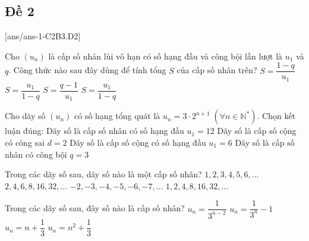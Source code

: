 \subsection{Đề 2}%
[ans/ans-1-C2B3.D2]
\caulc
%
\begin{ex}%
	Cho $(u_n)$ là cấp số nhân lùi vô hạn có số hạng đầu và công bội lần lượt là $u_1$ và $q$. Công thức nào sau đây dùng để tính tổng $S$ của cấp số nhân trên?
	\choice
	{$S=\dfrac{1-q}{u_1}$}
	{$S=\dfrac{u_1}{1-q}$}
	{$S=\dfrac{q-1}{u_1}$}
	{\True $S=\dfrac{u_1}{1-q}$}
\end{ex}
\begin{ex}%
	Cho dãy số $(u_n)$ có số hạng tổng quát là $u_n=3\cdot 2^{n+1}\; \left(\forall n\in {{\mathbb{N}}^*}\right)$. Chọn kết luận đúng:
	\choice
	{\True Dãy số là cấp số nhân có số hạng đầu $u_1=12$}
	{Dãy số là cấp số cộng có công sai $d=2$}
	{Dãy số là cấp số cộng có số hạng đầu $u_1=6$}
	{Dãy số là cấp số nhân có công bội $q=3$}
\end{ex}
\begin{ex}%
	Trong các dãy số sau, dãy số nào là một cấp số nhân?
	\choice
	{$1,  2,  3,  4,  5,  6,  \ldots$}
	{$2,  4,  6,  8,  16,  32,\ldots$}
	{$-2,  -3,  -4,  -5,  -6,  -7,  \ldots$}
	{\True $1,  2,  4,  8,  16,  32,  \ldots$}
\end{ex}
\begin{ex}%
	Trong các dãy số sau, đây số nào là cấp số nhân?
	\choice
	{\True $u_n=\dfrac{1}{3^{n-2}}$}
	{$u_n=\dfrac{1}{3^n}-1$}
	{$u_n=n+\dfrac{1}{3}$}
	{$u_n=n^2+\dfrac{1}{3}$}
\end{ex}
